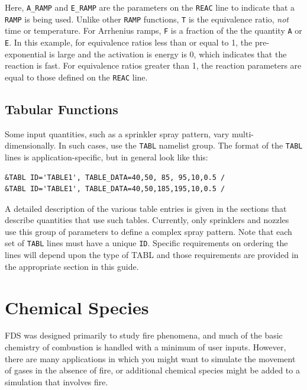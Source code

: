 \documentclass[11pt]{book}
\newcommand{\ct}{\tt\small}
\begin{document}
Here, {\ct A\_RAMP} and {\ct E\_RAMP} are the parameters on the {\ct REAC} line to indicate that a {\ct RAMP} is being used. Unlike other {\ct RAMP} functions, {\ct T} is the equivalence ratio, {\em not} time or temperature. For Arrhenius ramps, {\ct F} is a fraction of the the quantity {\ct A} or {\ct E}. In this example, for equivalence ratios less than or equal to 1, the pre-exponential is large and the activation is energy is 0, which indicates that the reaction is fast. For equivalence ratios greater than 1, the reaction parameters are equal to those defined on the {\ct REAC} line.



\section{Tabular Functions}

\label{info:TABL}

Some input quantities, such as a sprinkler spray pattern, vary multi-dimensionally. In such cases, use
the {\ct TABL} namelist group. The format of the {\ct TABL} lines is application-specific, but in general look like this:

\footnotesize
\begin{verbatim}
&TABL ID='TABLE1', TABLE_DATA=40,50, 85, 95,10,0.5 /
&TABL ID='TABLE1', TABLE_DATA=40,50,185,195,10,0.5 /
\end{verbatim}
\normalsize

\noindent
A detailed description of the various table entries is given in the sections that describe quantities that use such
tables. Currently, only sprinklers and nozzles use this group of parameters to define a complex spray pattern.
Note that each set of {\ct TABL} lines must have a unique {\ct ID}.  Specific requirements on ordering the lines
will depend upon the type of TABL and those requirements are provided in the appropriate section in this guide.






\chapter{Chemical Species}
\label{info:Chemical Species}

FDS was designed primarily to study fire phenomena, and much of the basic chemistry of combustion is handled with a minimum of user inputs. However, there are many applications in which you might want to simulate the movement of gases in the absence of fire, or additional chemical species might be added to a simulation that involves fire.
\end{document}
